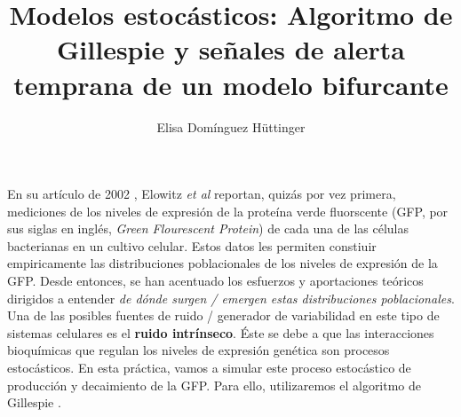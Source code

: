 \documentclass[10pt,letterpaper]{article}
\title{Modelos estocásticos: Algoritmo de Gillespie y señales de alerta temprana de un modelo bifurcante}
\author{Elisa Dom\'{i}nguez H\"{u}ttinger}
\begin{document}
 \maketitle


En su artículo de 2002 \cite{Elowitz2002}, Elowitz \textit{et al} reportan, quizás por vez primera,  mediciones de los niveles de expresión de la proteína verde fluorscente (GFP, por sus siglas en inglés, \textit{Green Flourescent Protein}) de cada una de las células bacterianas en un cultivo celular. Estos datos les permiten constiuir empiricamente las distribuciones poblacionales de los niveles de expresión de  la GFP. 
Desde entonces, se han acentuado los esfuerzos y aportaciones teóricos dirigidos a entender \textit{de dónde surgen / emergen estas distribuciones poblacionales}.
Una de las posibles fuentes de ruido / generador de variabilidad en este tipo de sistemas celulares es el 
 \textbf{ruido intrínseco}. Éste se debe a que las interacciones bioquímicas que regulan los niveles de expresión genética son procesos estocásticos. 
En esta práctica, vamos a simular este proceso estocástico de producción y decaimiento de la GFP.
Para ello, utilizaremos el algoritmo de Gillespie \cite{Gillesple1977}. %
\end{document}

